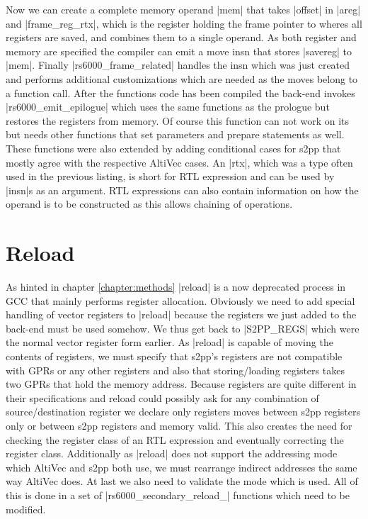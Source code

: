 Now we can create a complete memory operand |mem| that takes |offset| in |areg| and |frame_reg_rtx|, which is the register holding the frame pointer to wheres all registers are saved, and combines them to a single operand.
As both register and memory are specified the compiler can emit a move insn that stores |savereg| to |mem|.
Finally |rs6000_frame_related| handles the insn which was just created and performs additional customizations which are needed as the moves belong to a function call.
After the functions code has been compiled the back-end invokes |rs6000_emit_epilogue| which uses the same functions as the prologue but restores the registers from memory.
Of course this function can not work on its but needs other functions that set parameters and prepare statements as well.
These functions were also extended by adding conditional cases for s2pp that mostly agree with the respective AltiVec cases.
An |rtx|, which was a type often used in the previous listing, is short for RTL expression and can be used by |insn|s as an argument.
RTL expressions can also contain information on how the operand is to be constructed as this allows chaining of operations.

\section{Reload}
As hinted in chapter \ref{chapter:methods} |reload| is a now deprecated process in GCC that mainly performs register allocation.
Obviously we need to add special handling of vector registers to |reload| because the registers we just added to the back-end must be used somehow.
We thus get back to |S2PP_REGS| which were the normal vector register form earlier.
As |reload| is capable of moving the contents of registers, we must specify that s2pp's registers are not compatible with GPRs or any other registers and also that storing/loading registers takes two GPRs that hold the memory address.
Because registers are quite different in their specifications and reload could possibly ask for any combination of source/destination register we declare only registers moves between s2pp registers only or between s2pp registers and memory valid.
This also creates the need for checking the register class of an RTL expression and eventually correcting the register class.
Additionally as |reload| does not support the addressing mode which AltiVec and s2pp both use, we must rearrange indirect addresses the same way AltiVec does.
At last we also need to validate the mode which is used.
All of this is done in a set of  |rs6000_secondary_reload_| functions which need to be modified.

